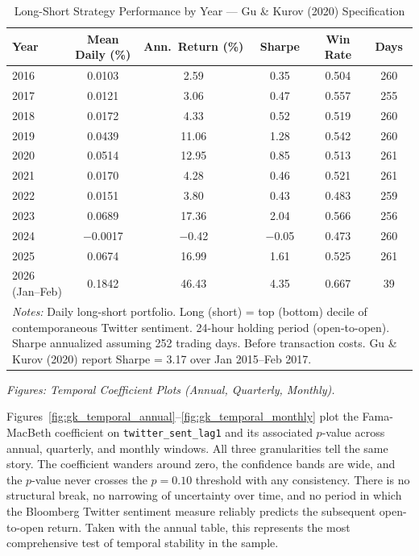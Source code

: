 \documentclass[12pt]{article}
\begin{document}
\begin{table}[htbp]
\centering
\caption{Long-Short Strategy Performance by Year --- Gu \& Kurov (2020) Specification}
\label{tab:gk_ls_annual}
\begin{tabular}{lccccc}
\hline\hline
Year & Mean Daily (\%) & Ann.\ Return (\%) & Sharpe & Win Rate & Days \\
\hline
  2016              & 0.0103  & 2.59  & 0.35 & 0.504 & 260 \\
  2017              & 0.0121  & 3.06  & 0.47 & 0.557 & 255 \\
  2018              & 0.0172  & 4.33  & 0.52 & 0.519 & 260 \\
  2019              & 0.0439  & 11.06 & 1.28 & 0.542 & 260 \\
  2020              & 0.0514  & 12.95 & 0.85 & 0.513 & 261 \\
  2021              & 0.0170  & 4.28  & 0.46 & 0.521 & 261 \\
  2022              & 0.0151  & 3.80  & 0.43 & 0.483 & 259 \\
  2023              & 0.0689  & 17.36 & 2.04 & 0.566 & 256 \\
  2024              & $-$0.0017 & $-$0.42 & $-$0.05 & 0.473 & 260 \\
  2025              & 0.0674  & 16.99 & 1.61 & 0.525 & 261 \\
  2026 (Jan--Feb)   & 0.1842  & 46.43 & 4.35 & 0.667 & 39  \\
\hline\hline
\multicolumn{6}{p{0.95\linewidth}}{\footnotesize \textit{Notes:} Daily long-short portfolio.
Long (short) = top (bottom) decile of contemporaneous Twitter sentiment. 24-hour holding period
(open-to-open). Sharpe annualized assuming 252 trading days. Before transaction costs.
Gu \& Kurov (2020) report Sharpe = 3.17 over Jan 2015--Feb 2017.}
\end{tabular}
\end{table}

\medskip

\noindent\textit{Figures: Temporal Coefficient Plots (Annual, Quarterly, Monthly).}

Figures~\ref{fig:gk_temporal_annual}--\ref{fig:gk_temporal_monthly} plot the Fama-MacBeth
coefficient on \texttt{twitter\_sent\_lag1} and its associated $p$-value across annual,
quarterly, and monthly windows. All three granularities tell the same story. The coefficient
wanders around zero, the confidence bands are wide, and the $p$-value never crosses the
$p = 0.10$ threshold with any consistency. There is no structural break, no narrowing of
uncertainty over time, and no period in which the Bloomberg Twitter sentiment measure reliably
predicts the subsequent open-to-open return. Taken with the annual table, this represents the
most comprehensive test of temporal stability in the sample.
\end{document}
